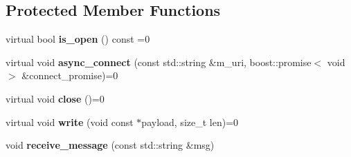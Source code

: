 \subsection*{Protected Member Functions}
\begin{DoxyCompactItemize}
\item 
virtual bool {\bfseries is\+\_\+open} () const =0\hypertarget{classautobahn_1_1wamp__websocket__transport_a4a8bbfde26d812de09e073c921668a32}{}\label{classautobahn_1_1wamp__websocket__transport_a4a8bbfde26d812de09e073c921668a32}

\item 
virtual void {\bfseries async\+\_\+connect} (const std\+::string \&m\+\_\+uri, boost\+::promise$<$ void $>$ \&connect\+\_\+promise)=0\hypertarget{classautobahn_1_1wamp__websocket__transport_a8d9e5ab210db02b321b56f491c0cc3d2}{}\label{classautobahn_1_1wamp__websocket__transport_a8d9e5ab210db02b321b56f491c0cc3d2}

\item 
virtual void {\bfseries close} ()=0\hypertarget{classautobahn_1_1wamp__websocket__transport_a3503f4c929e7fccdb5ee75ccacd9c241}{}\label{classautobahn_1_1wamp__websocket__transport_a3503f4c929e7fccdb5ee75ccacd9c241}

\item 
virtual void {\bfseries write} (void const $\ast$payload, size\+\_\+t len)=0\hypertarget{classautobahn_1_1wamp__websocket__transport_acad33415b8cfa8f70bb139a8e7e38bc0}{}\label{classautobahn_1_1wamp__websocket__transport_acad33415b8cfa8f70bb139a8e7e38bc0}

\item 
void {\bfseries receive\+\_\+message} (const std\+::string \&msg)\hypertarget{classautobahn_1_1wamp__websocket__transport_adf1f30b2b1d0a463f01c779e70f9ac2b}{}\label{classautobahn_1_1wamp__websocket__transport_adf1f30b2b1d0a463f01c779e70f9ac2b}

\end{DoxyCompactItemize}
